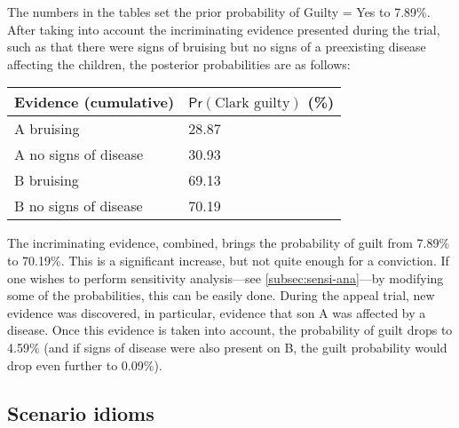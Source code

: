 \documentclass{article}
\newcommand{\pr}{\mathsf{Pr}}
\begin{document}
The numbers in the tables set the prior probability of \textrm{Guilty = Yes} to 7.89\%. After taking into account the incriminating evidence presented during the trial, such as that there were signs of bruising but no signs of a preexisting disease affecting the children, the posterior probabilities are as follows:

\begin{center}
\begin{tabular}{@{}ll@{}}
\toprule
Evidence (cumulative) & $\pr(\textrm{Clark guilty})$ (\%)
\\ \midrule 
A bruising& 28.87\\
A no signs of disease & 30.93\\
B bruising & 69.13\\
B no signs of disease  & 70.19\\
 \bottomrule
\end{tabular}
\end{center}

\noindent The incriminating evidence, combined, brings the probability of guilt from 7.89\% to 70.19\%. This is a significant increase, but not quite enough for a conviction. If one wishes to perform sensitivity analysis---see \ref{subsec:sensi-ana}---by modifying some of the probabilities, this can be easily done.
%
During the appeal trial, new evidence was discovered, in particular, evidence that son A was affected by a disease. 
Once this evidence is taken into account, the probability of guilt drops to 4.59\% (and if signs of disease were also present on B, the guilt probability would drop even further to 0.09\%).


\subsection{Scenario idioms}

\end{document}
